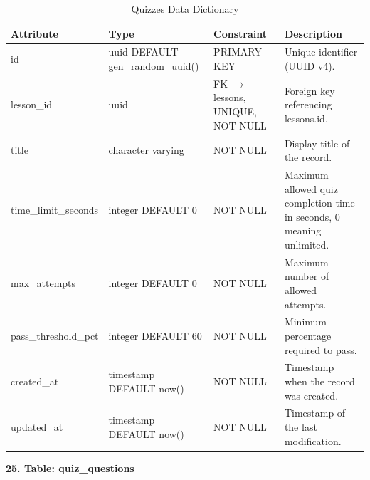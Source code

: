 \documentclass[12pt, oneside]{article} %
\newcommand{\tabbreak}{\hyphenpenalty=200\exhyphenpenalty=200\tolerance=4000\hbadness=10000\hspace{0pt}}
\begin{document}
\begin{table}[H]
\caption{Quizzes Data Dictionary}
\label{tab:dd_quizzes}
\vspace{-4mm}
\begin{center}
\renewcommand{\arraystretch}{1.15}
\scriptsize
\begin{tabular}{|>{\raggedright\arraybackslash\tabbreak}p{2.67cm}|>{\raggedright\arraybackslash\tabbreak}p{2.93cm}|>{\raggedright\arraybackslash\tabbreak}p{2.67cm}|>{\raggedright\arraybackslash\tabbreak}p{4.51cm}|}
\hline
\textbf{Attribute} & \textbf{Type} & \textbf{Constraint} & \textbf{Description} \\ \hline
id & uuid DEFAULT gen\_random\_uuid() & PRIMARY KEY & Unique identifier (UUID v4). \\ \hline
lesson\_id & uuid & FK $\rightarrow$ lessons, UNIQUE, NOT NULL & Foreign key referencing lessons.id. \\ \hline
title & character varying & NOT NULL & Display title of the record. \\ \hline
time\_limit\_seconds & integer DEFAULT 0 & NOT NULL & Maximum allowed quiz completion time in seconds, 0 meaning unlimited. \\ \hline
max\_attempts & integer DEFAULT 0 & NOT NULL & Maximum number of allowed attempts. \\ \hline
pass\_threshold\_pct & integer DEFAULT 60 & NOT NULL & Minimum percentage required to pass. \\ \hline
created\_at & timestamp DEFAULT now() & NOT NULL & Timestamp when the record was created. \\ \hline
updated\_at & timestamp DEFAULT now() & NOT NULL & Timestamp of the last modification. \\ \hline
\end{tabular}
\end{center}
\end{table}

\textbf{25. Table: quiz\_questions}
\end{document}
